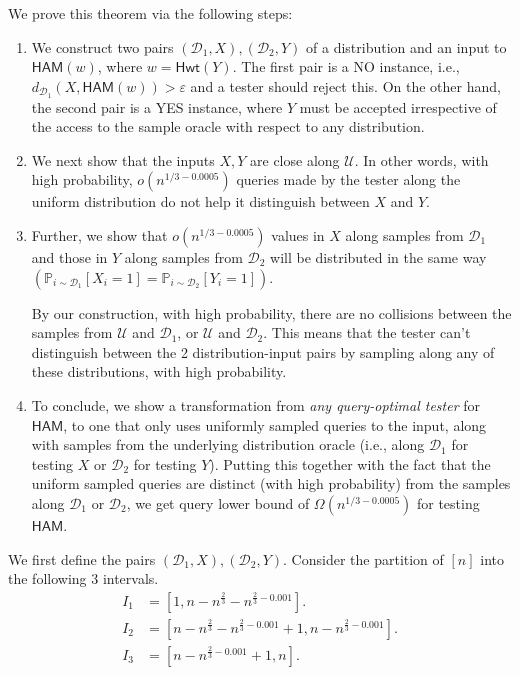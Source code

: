 \documentclass[10pt,a4paper]{article}
\newcommand{\Hamming}{\mathsf{Hwt}}
\newcommand{\HAM}{\mathsf{HAM}}
\newcommand{\sU}{\mathcal{U}}
\newcommand{\sD}{\mathcal{D}}
\begin{document}
We prove this theorem via the following steps:
\begin{enumerate}
    \item We construct two pairs $(\mathcal{D}_{1}, X),(\mathcal{D}_{2}, Y)$ of a distribution and an input to $\HAM(w)$, where $w = \Hamming(Y)$. 
    The first pair is a NO instance, i.e., $d_{\mathcal{D}_{1}}(X, \HAM(w))>\varepsilon$ and a tester should reject this. On the other hand, the second pair is a YES instance, where $Y$ must be accepted irrespective of the access to the sample oracle with respect to any distribution. 
    
    \item We next show that the inputs $X,Y$ are close along $\sU$. In other words, with high probability, $o(n^{1/3-0.0005})$ queries made by the tester along the uniform distribution do not help it distinguish between $X$ and $Y$.
    
    \item Further, we show that $o(n^{1/3-0.0005})$ values in $X$ along samples from $\mathcal{D}_{1}$ and those in $Y$ along samples from $\mathcal{D}_{2}$ will be distributed in the same way $(\mathbb{P}_{i\sim \mathcal{D}_{1}}\left [X_{i}=1\right]=\mathbb{P}_{i\sim \mathcal{D}_{2}}\left [Y_{i}=1\right])$. 
    
    By our construction, with high probability, there are no collisions between the samples from $\sU$ and $\sD_1$, or $\sU$ and $\sD_2$. This means that the tester can't distinguish between the 2 distribution-input pairs by sampling along any of these distributions, with high probability. 
    
    \item To conclude, we show a transformation from \textit{any query-optimal tester} for $\HAM$, to one that only uses uniformly sampled queries to the input, along with samples from the underlying distribution oracle (i.e., along $\sD_{1}$ for testing $X$ or $\sD_{2}$ for testing $Y$). 
    Putting this together with the fact that the uniform sampled queries are distinct (with high probability) from the samples along $\sD_1$ or $\sD_2$, we get query lower bound of $\Omega(n^{1/3-0.0005})$ for testing $\HAM$.
\end{enumerate}
    
We first define the pairs $(\mathcal{D}_{1}, X),(\mathcal{D}_{2}, Y)$. Consider the partition of $[n]$ into the following 3 intervals. 
\[
\begin{split}
I_{1}&=[1,n-n^{\frac{2}{3}}-n^{\frac{2}{3}-0.001}].\\ I_{2}&=[n-n^{\frac{2}{3}}-n^{\frac{2}{3}-0.001}+1, n-n^{\frac{2}{3}-0.001}].\\ I_{3}&=[n-n^{\frac{2}{3}-0.001}+1,n].
\end{split}
\]
\end{document}
